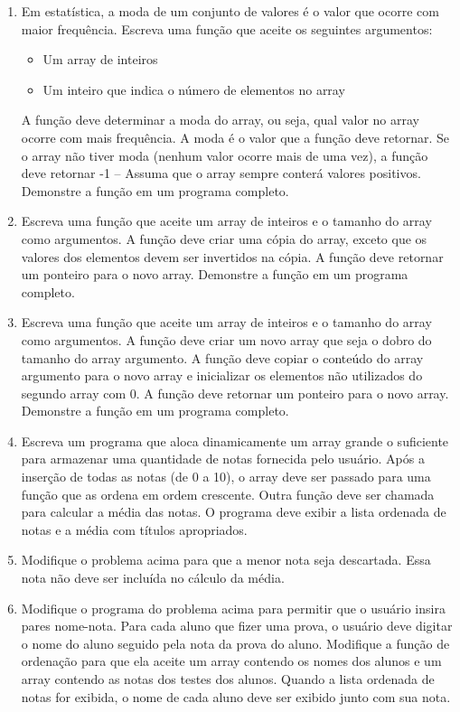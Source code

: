 \documentclass[12pt]{article}
\begin{document}
\begin{enumerate}
    \item Em estatística, a moda de um conjunto de valores é o valor que ocorre com maior frequência. Escreva uma função que aceite os seguintes argumentos: 
    \begin{itemize}
      \item Um array de inteiros
      \item Um inteiro que indica o número de elementos no array
    \end{itemize}
    A função deve determinar a moda do array, ou seja, qual valor no array ocorre com mais frequência. A moda é o valor que a função deve retornar. Se o array não tiver moda (nenhum valor ocorre mais de uma vez), a função deve retornar -1 -- Assuma que o array sempre conterá valores positivos. Demonstre a função em um programa completo.

    \item Escreva uma função que aceite um array de inteiros e o tamanho do array como argumentos. A função deve criar uma cópia do array, exceto que os valores dos elementos devem ser invertidos na cópia. A função deve retornar um ponteiro para o novo array. Demonstre a função em um programa completo.
    
    \item Escreva uma função que aceite um array de inteiros e o tamanho do array como argumentos. A função deve criar um novo array que seja o dobro do tamanho do array argumento. A função deve copiar o conteúdo do array argumento para o novo array e inicializar os elementos não utilizados do segundo array com 0. A função deve retornar um ponteiro para o novo array. Demonstre a função em um programa completo.

    \item Escreva um programa que aloca dinamicamente um array grande o suficiente para armazenar uma quantidade de notas fornecida pelo usuário. Após a inserção de todas as notas (de 0 a 10), o array deve ser passado para uma função que as ordena em ordem crescente. Outra função deve ser chamada para calcular a média das notas. O programa deve exibir a lista ordenada de notas e a média com títulos apropriados. 

    \item Modifique o problema acima para que a menor nota seja descartada. Essa nota não deve ser incluída no cálculo da média.

    \item Modifique o programa do problema acima para permitir que o usuário insira pares nome-nota. Para cada aluno que fizer uma prova, o usuário deve digitar o nome do aluno seguido pela nota da prova do aluno. Modifique a função de ordenação para que ela aceite um array contendo os nomes dos alunos e um array contendo as notas dos testes dos alunos. Quando a lista ordenada de notas for exibida, o nome de cada aluno deve ser exibido junto com sua nota.



\end{enumerate}
\end{document}
